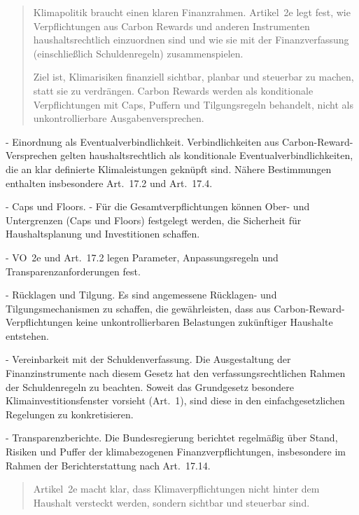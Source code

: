 \documentclass[12pt,a4paper]{scrartcl}
\begin{document}
\begin{quote}
Klimapolitik braucht einen klaren Finanzrahmen. Artikel 2e legt fest, wie Verpflichtungen aus Carbon Rewards und anderen Instrumenten haushaltsrechtlich einzuordnen sind und wie sie mit der Finanzverfassung (einschließlich Schuldenregeln) zusammenspielen.

Ziel ist, Klimarisiken finanziell sichtbar, planbar und steuerbar zu machen, statt sie zu verdrängen. Carbon Rewards werden als konditionale Verpflichtungen mit Caps, Puffern und Tilgungsregeln behandelt, nicht als unkontrollierbare Ausgabenversprechen.
\end{quote}

- Einordnung als Eventualverbindlichkeit. Verbindlichkeiten aus Carbon-Reward-Versprechen gelten haushaltsrechtlich als konditionale Eventualverbindlichkeiten, die an klar definierte Klimaleistungen geknüpft sind. Nähere Bestimmungen enthalten insbesondere Art. 17.2 und Art. 17.4.

- Caps und Floors.
- Für die Gesamtverpflichtungen können Ober- und Untergrenzen (Caps und Floors) festgelegt werden, die Sicherheit für Haushaltsplanung und Investitionen schaffen.

- VO 2e und Art. 17.2 legen Parameter, Anpassungsregeln und Transparenzanforderungen fest.

- Rücklagen und Tilgung. Es sind angemessene Rücklagen- und Tilgungsmechanismen zu schaffen, die gewährleisten, dass aus Carbon-Reward-Verpflichtungen keine unkontrollierbaren Belastungen zukünftiger Haushalte entstehen.

- Vereinbarkeit mit der Schuldenverfassung. Die Ausgestaltung der Finanzinstrumente nach diesem Gesetz hat den verfassungsrechtlichen Rahmen der Schuldenregeln zu beachten. Soweit das Grundgesetz besondere Klimainvestitionsfenster vorsieht (Art. 1), sind diese in den einfachgesetzlichen Regelungen zu konkretisieren.

- Transparenzberichte. Die Bundesregierung berichtet regelmäßig über Stand, Risiken und Puffer der klimabezogenen Finanzverpflichtungen, insbesondere im Rahmen der Berichterstattung nach Art. 17.14.

{\footnotesize\begin{quote}
Artikel 2e macht klar, dass Klimaverpflichtungen nicht hinter dem Haushalt versteckt werden, sondern sichtbar und steuerbar sind.
\end{quote}}



\end{document}

